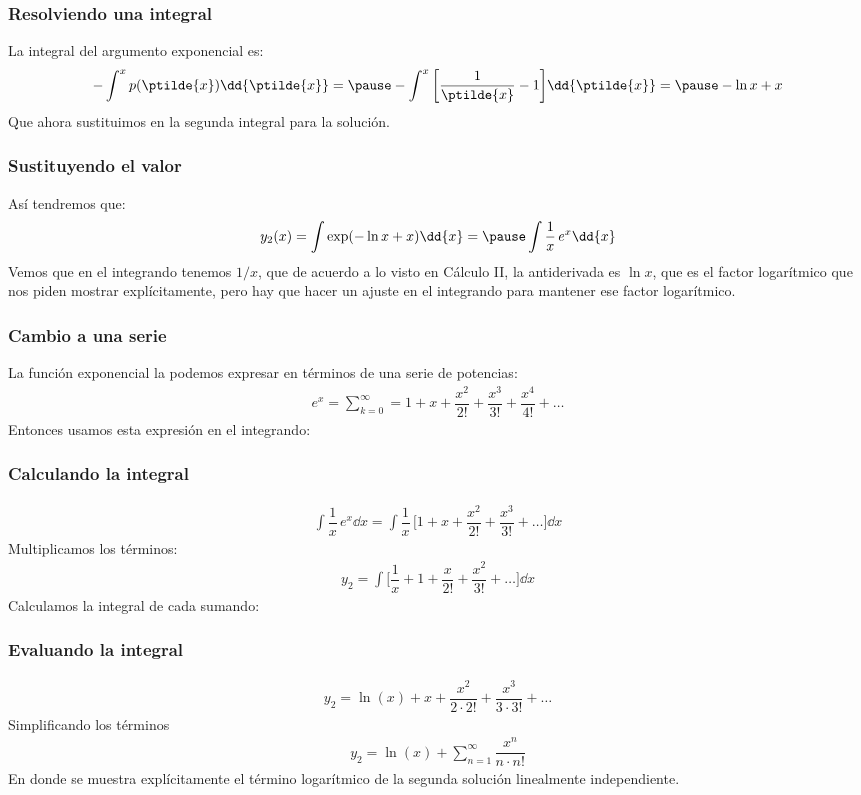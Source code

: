 \begin{frame}
\frametitle{Resolviendo una integral}
La integral del argumento exponencial es:
\begin{eqnarray*}
- \int^{x} p(\ptilde{x}) \dd{\ptilde{x}} = \pause - \int^{x} \bigg[ \dfrac{1}{\ptilde{x}} - 1 \bigg] \dd{\ptilde{x}}= \pause - \ln x + x
\end{eqnarray*}
\pause
Que ahora sustituimos en la segunda integral para la solución.
\end{frame}
\begin{frame}
\frametitle{Sustituyendo el valor}
Así tendremos que:
\begin{eqnarray*}
y_{2} (x) = \int \exp(- \ln x + x ) \dd{x} = \pause \int \dfrac{1}{x} \, e^{x} \dd{x}
\end{eqnarray*}
\pause
Vemos que en el integrando tenemos $1/x$, que de acuerdo a lo visto en Cálculo II, la antiderivada es $\ln x$, que es el factor logarítmico que nos piden mostrar explícitamente, pero hay que hacer un ajuste en el integrando para mantener ese factor logarítmico.
\end{frame}
\begin{frame}
\frametitle{Cambio a una serie}
La función exponencial la podemos expresar en términos de una serie de potencias:
\begin{align*}
e^{x} = \sum_{k=0}^{\infty} =  1 + x + \dfrac{x^{2}}{2!} + \dfrac{x^{3}}{3!} + \dfrac{x^{4}}{4!} + \ldots
\end{align*}
\pause
Entonces usamos esta expresión en el integrando:
\end{frame}
\begin{frame}
\frametitle{Calculando la integral}
\begin{align*}
\int \dfrac{1}{x} \, e^{x} \dd{x} = \int \dfrac{1}{x} \, \bigg[ 1 + x + \dfrac{x^{2}}{2!} + \dfrac{x^{3}}{3!} + \ldots \bigg] \dd{x}
\end{align*}
\pause
Multiplicamos los términos:
\begin{align*}
y_{2} = \int \bigg[ \dfrac{1}{x} + 1 + \dfrac{x}{2!} + \dfrac{x^{2}}{3!} + \ldots \bigg] \dd{x}
\end{align*}
Calculamos la integral de cada sumando:
\end{frame}
\begin{frame}
\frametitle{Evaluando la integral}
\begin{align*}
y_{2} =  \ln (x) + x + \dfrac{x^{2}}{2 \cdot 2!} + \dfrac{x^{3}}{3 \cdot 3!} + \ldots
\end{align*}
\pause
Simplificando los términos
\begin{align*}
y_{2} =  \ln (x) + \sum_{n=1}^{\infty} \dfrac{x^{n}}{n \cdot n!}
\end{align*}
En donde se muestra explícitamente el término logarítmico de la segunda solución linealmente independiente.
\end{frame}
